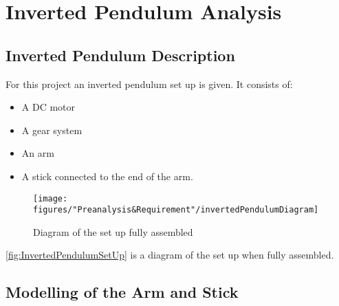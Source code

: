 \chapter{Inverted Pendulum Analysis}


\section{Inverted Pendulum Description}\label{sec:IPDesc}
For this project an inverted pendulum set up is given. It consists of:
\begin{itemize}
	\item A DC motor
	\item A gear system
	\item An arm
	\item A stick connected to the end of the arm.
\end{itemize}

\begin{figure} [htbp]
	\centering
	\texttt{[image: figures/"Preanalysis\&Requirement"/invertedPendulumDiagram]}
	\caption{Diagram of the set up fully assembled} \label{fig:InvertedPendulumSetUp}
\end{figure}

\autoref{fig:InvertedPendulumSetUp} is a diagram of the set up when fully assembled.




\section{Modelling of the Arm and Stick}\label{sec:StickArm}

